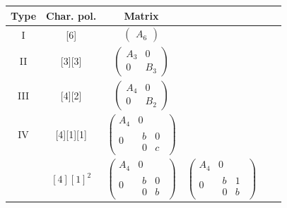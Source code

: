 \documentclass[11pt,a4paper]{article}
\theoremstyle{plain}
\theoremstyle{definition}
\theoremstyle{remark}
\begin{document}
\begin{center}
\fontsize{6pt}{6pt}\selectfont
\renewcommand{\arraystretch}{1.4}
\begin{tabular}{|c|c|cccc|}
\hline
\textbf{Type} & \textbf{Char. pol.} & \textbf{Matrix} & && \\ \hline

I & [6] &
$\begin{pmatrix}
A_6
\end{pmatrix}$ & & &\\ \hline

II & [3][3] &
$\begin{pmatrix}
A_3 & 0 \\
0   & B_3
\end{pmatrix}$ & & &\\ \hline

III & [4][2] &
$\begin{pmatrix}
A_4 & 0 \\
0   & B_2
\end{pmatrix}$ & & &\\ \hline

IV & [4][1][1] & 
$\begin{pmatrix}
A_4 & 0 \\
0   & \begin{matrix} b & 0 \\ 0 & c \end{matrix}
\end{pmatrix}$ &&&\\ \hline
 &  $[4][1]^2$ &
$\begin{pmatrix}
A_4 & 0 \\
0   & \begin{matrix} b & 0 \\ 0 & b \end{matrix}
\end{pmatrix}$ &
$\begin{pmatrix}
A_4 & 0 \\
0   & \begin{matrix} b & 1 \\ 0 & b \end{matrix}
\end{pmatrix}$ &&
\\ \hline


\end{tabular}
\end{center}
\end{document}
